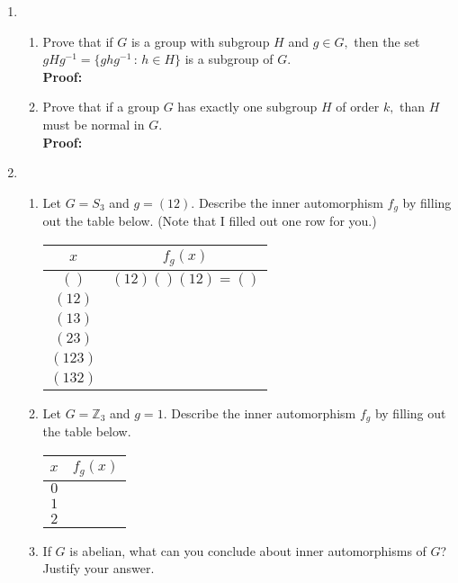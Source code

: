 \documentclass[12pt]{article}
\newcommand{\bbZ}{\mathbb{Z}}
\begin{document}
\begin{enumerate}
\item 
	\begin{enumerate}
	\item Prove that if $G$ is a group with subgroup $H$ and $g \in G,$ then the set $gHg^{-1}=\{ghg^{-1} \, : \, h \in H\}$ is a subgroup of $G.$\\
	
	\textbf{Proof:}
	\vfill
	
	\item Prove that if a group $G$ has exactly one subgroup $H$ of order $k,$ than $H$ must be normal in $G.$\\
	
	\textbf{Proof:}
	\vfill
	\end{enumerate}
\newpage
\item 
	\begin{enumerate}
	\item Let $G=S_3$ and $g=(12).$ Describe the inner automorphism $f_g$ by filling out the table below. (Note that I filled out one row for you.)\\
	
	\begin{tabular}{c|c}
	$x$ & $f_g(x)$ \\
	\hline
	$()$ & $(12)()(12)=()$ \\
	$(12)$ & \\
	$(13)$ & \\
	$(23)$ & \\
	$(123)$ & \\
	$(132)$ & \\
	\end{tabular}
	
	\item Let $G=\bbZ_3$ and $g=1.$ Describe the inner automorphism $f_g$ by filling out the table below. \\
	
	\begin{tabular}{c|c}
	$x$ & $f_g(x)$ \\
	\hline
	$0$ & \\
	$1$ & \\
	$2$ & \\
	\end{tabular}
		
	\item If $G$ is abelian, what can you conclude about inner automorphisms of $G$? Justify your answer.\\
	

\end{enumerate}
\end{enumerate}
\end{document}
